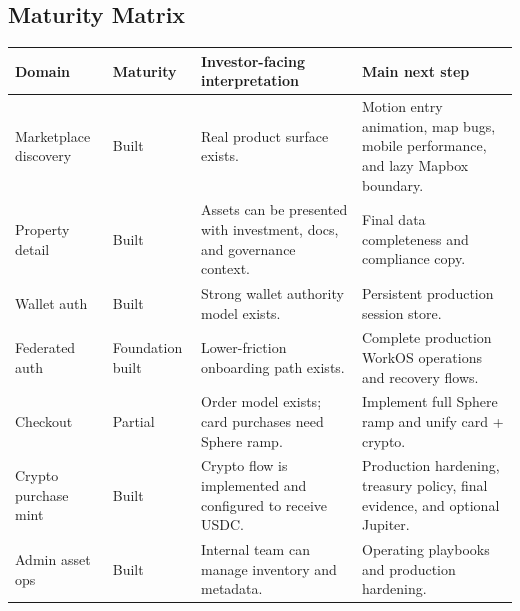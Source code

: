 \documentclass[
  10pt,
  letterpaper,
]{article}
\newcounter{none} %
\begin{document}
\subsection{Maturity Matrix}\label{maturity-matrix}

{\def\LTcaptype{none} %
\begin{longtable}[]{@{}
  >{\raggedright\arraybackslash}p{}
  >{\raggedright\arraybackslash}p{}
  >{\raggedright\arraybackslash}p{}
  >{\raggedright\arraybackslash}p{}@{}}
\toprule\noalign{}
\begin{minipage}[b]{\linewidth}\raggedright
Domain
\end{minipage} & \begin{minipage}[b]{\linewidth}\raggedright
Maturity
\end{minipage} & \begin{minipage}[b]{\linewidth}\raggedright
Investor-facing interpretation
\end{minipage} & \begin{minipage}[b]{\linewidth}\raggedright
Main next step
\end{minipage} \\
\midrule\noalign{}
\endhead
\bottomrule\noalign{}
\endlastfoot
Marketplace discovery & Built & Real product surface exists. & Motion
entry animation, map bugs, mobile performance, and lazy Mapbox
boundary. \\
Property detail & Built & Assets can be presented with investment, docs,
and governance context. & Final data completeness and compliance
copy. \\
Wallet auth & Built & Strong wallet authority model exists. & Persistent
production session store. \\
Federated auth & Foundation built & Lower-friction onboarding path
exists. & Complete production WorkOS operations and recovery flows. \\
Checkout & Partial & Order model exists; card purchases need Sphere
ramp. & Implement full Sphere ramp and unify card + crypto. \\
Crypto purchase mint & Built & Crypto flow is implemented and configured
to receive USDC. & Production hardening, treasury policy, final
evidence, and optional Jupiter. \\
Admin asset ops & Built & Internal team can manage inventory and
metadata. & Operating playbooks and production hardening. \\

\end{longtable}}
\end{document}
